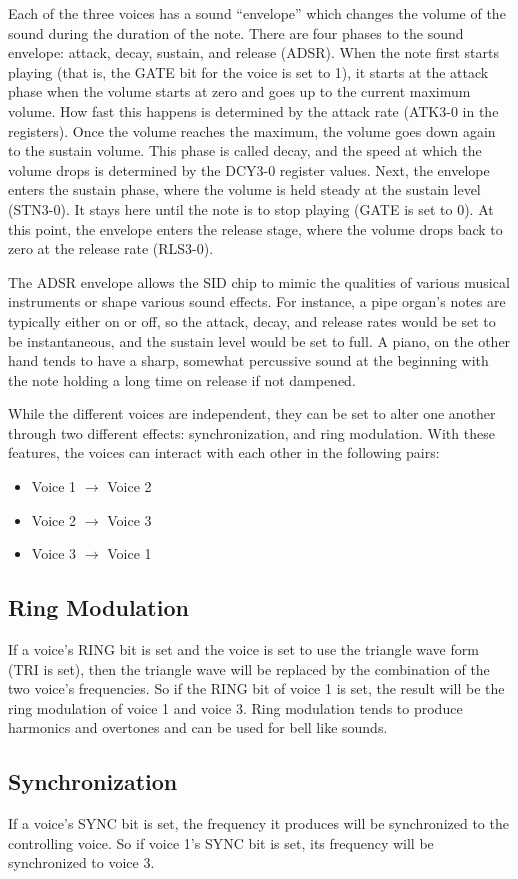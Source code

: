 Each of the three voices has a sound ``envelope'' which changes the volume of the sound during the duration of the note. There are four phases to the sound envelope: attack, decay, sustain, and release (ADSR). When the note first starts playing (that is, the GATE bit for the voice is set to 1), it starts at the attack phase when the volume starts at zero and goes up to the current maximum volume. How fast this happens is determined by the attack rate (ATK3-0 in the registers). Once the volume reaches the maximum, the volume goes down again to the sustain volume. This phase is called decay, and the speed at which the volume drops is determined by the DCY3-0 register values. Next, the envelope enters the sustain phase, where the volume is held steady at the sustain level (STN3-0). It stays here until the note is to stop playing (GATE is set to 0). At this point, the envelope enters the release stage, where the volume drops back to zero at the release rate (RLS3-0).

The ADSR envelope allows the SID chip to mimic the qualities of various musical instruments or shape various sound effects. For instance, a pipe organ's notes are typically either on or off, so the attack, decay, and release rates would be set to be instantaneous, and the sustain level would be set to full. A piano, on the other hand tends to have a sharp, somewhat percussive sound at the beginning with the note holding a long time on release if not dampened.

While the different voices are independent, they can be set to alter one another through two different effects: synchronization, and ring modulation. With these features, the voices can interact with each other in the following pairs:

\begin{itemize}
\item Voice 1 $\rightarrow$ Voice 2
\item Voice 2 $\rightarrow$ Voice 3
\item Voice 3 $\rightarrow$ Voice 1
\end{itemize}

\subsection{Ring Modulation}

If a voice's RING bit is set and the voice is set to use the triangle wave form (TRI is set), then the triangle wave will be replaced by the combination of the two voice's frequencies. So if the RING bit of voice 1 is set, the result will be the ring modulation of voice 1 and voice 3. Ring modulation tends to produce harmonics and overtones and can be used for bell like sounds.

\subsection{Synchronization}

If a voice's SYNC bit is set, the frequency it produces will be synchronized to the controlling voice. So if voice 1's SYNC bit is set, its frequency will be synchronized to voice 3.
